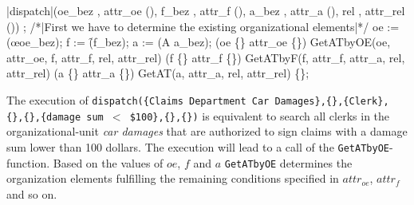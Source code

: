 
	\begin{samepage}
	{\small
	\NumberProgramstrue
	\begin{algorithm}[dispatch]\label{alg:GetIt}
	\begin{program}
	\FUNCT |dispatch|(oe_{bez} \subset \Bezeichner, attr_{oe} \subset (\Bezeichner \times \WerteMenge),
	f_{bez} \subset \Bezeichner, attr_f \subset (\Bezeichner \times \WerteMenge),
	a_{bez} \subset \Bezeichner, attr_a \subset (\Bezeichner \times \WerteMenge),
	rel \in \relname, attr_{rel} \subset (\Bezeichner \times \WerteMenge)) \subset \a
	\BEGIN
	\var {};
	/*|First we have to determine the existing organizational elements|*/
	oe := (\oe \rhd oe_{bez});
	f := (\f \rhd f_{bez});
	a := (A \rhd a_{bez});
	\IF (oe \neq \{\} \vee attr_{oe} \neq \{\}) \label{alg:GetIt:CallGetATbyOE}
	\THEN \RETURN \quad GetATbyOE(oe, attr_{oe}, f, attr_f, rel, attr_{rel})
	\FI
	\IF (f \neq \{\} \vee attr_f \neq \{\})
	\THEN \RETURN \quad GetATbyF(f, attr_f, attr_a, rel, attr_{rel})
	\FI
	\IF (a \neq \{\} \vee attr_a \neq \{\})
	\THEN \RETURN \quad GetAT(a, attr_a, rel, attr_{rel})
	\FI
	\RETURN \{\};
	\END
	\end{program}
	\end{algorithm}
	\NumberProgramsfalse
	}
	\end{samepage}

\noindent The execution of {\tt dispatch(\{Claims Department Car Damages\},\{\},\{Clerk\},\\ \{\},\{\},\{damage sum $<$ \$100\},\{\},\{\})} is equivalent to search all clerks in the organizational-unit {\it car damages} that are authorized to sign claims with a damage sum lower than 100 dollars. The execution will lead to a call of the {\tt GetATbyOE}-function. Based on the values of $oe$, $f$ and $a$ {\tt GetATbyOE} determines the organization elements fulfilling the remaining conditions specified in $attr_{oe}$, $attr_{f}$ and so on.

